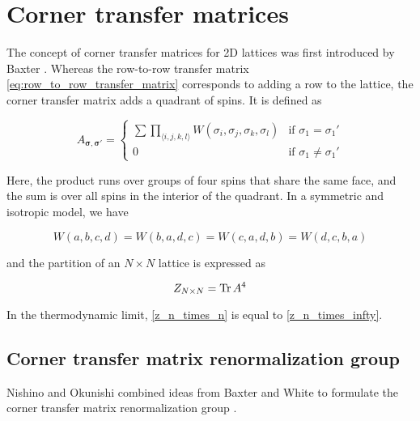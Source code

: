 


\section{Corner transfer matrices}

The concept of corner transfer matrices for 2D lattices was first introduced by
Baxter \cite{baxter1968dimers, baxter1978variational, baxter1982exactly}.
Whereas the row-to-row transfer matrix \eqref{eq:row_to_row_transfer_matrix}
corresponds to adding a row to the lattice, the corner transfer matrix adds
a quadrant of spins. It is defined as

\begin{equation}
  A_{\bm{\sigma}, \bm{\sigma'}} =
  \begin{cases}
    \sum \prod_{\langle i, j, k, l \rangle} W(\sigma_i, \sigma_j, \sigma_k, \sigma_l) & \text{if } \sigma_{1} = \sigma_{1}' \\
    0 & \text{if } \sigma_{1} \neq \sigma_{1}'
  \end{cases}
\end{equation}

Here, the product runs over groups of four spins that share the same face, and
the sum is over all spins in the interior of the quadrant.
In a symmetric and isotropic model, we have

\begin{equation}
  W(a, b, c, d) = W(b, a, d, c) = W(c, a, d, b) = W(d, c, b, a)
\end{equation}

and the partition of an $N \times N$ lattice is expressed as

\begin{equation}\label{z_n_times_n}
  Z_{N \times N} = \operatorname{Tr} A^4
\end{equation}

In the thermodynamic limit, \eqref{z_n_times_n} is equal to \eqref{z_n_times_infty}.



\subsection{Corner transfer matrix renormalization group}

Nishino and Okunishi combined ideas from Baxter and White to formulate the
corner transfer matrix renormalization group \cite{nishino1996corner}.
